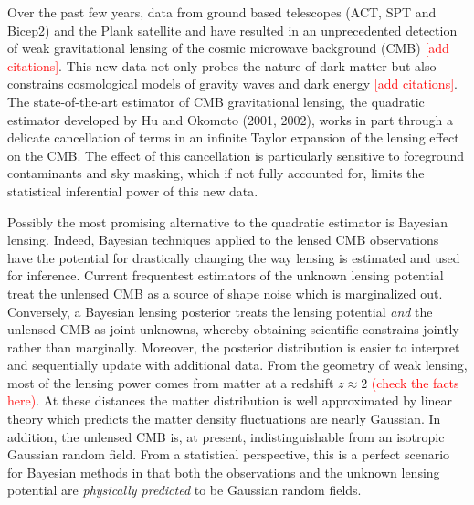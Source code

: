 \documentclass[noinfoline]{imsart}
\begin{document}
 Over the past few years, data from ground based telescopes (ACT, SPT and Bicep2) and the Plank satellite and have resulted in an unprecedented detection of weak gravitational lensing of the cosmic microwave background (CMB) \textcolor{red}{[add citations]}.  This new data not only probes the nature of dark matter but also constrains cosmological models of gravity waves and dark energy \textcolor{red}{[add citations]}. The state-of-the-art estimator of CMB gravitational lensing, the quadratic estimator developed by Hu and Okomoto (2001, 2002), works in part through a delicate cancellation of terms in an infinite Taylor expansion of the lensing effect on the CMB. The effect of this cancellation is particularly sensitive to foreground contaminants and sky masking, which  if not fully accounted for,  limits  the statistical inferential power of this new data.  

 Possibly the most promising alternative to the quadratic estimator is Bayesian lensing. Indeed, Bayesian techniques applied to the lensed CMB observations have the potential for drastically changing the way lensing is estimated and used for inference.  Current frequentest estimators of the unknown lensing potential treat the unlensed CMB as a source of shape noise which is marginalized out. Conversely, a Bayesian lensing posterior treats the lensing potential {\em and} the unlensed CMB as joint unknowns, whereby obtaining scientific constrains jointly rather than marginally. Moreover, the  posterior distribution is easier to interpret and sequentially update with additional data. From the geometry of weak lensing, most of the lensing power comes from matter at a redshift $z\approx 2$ \textcolor{red}{(check the facts here)}. At these distances the matter distribution is well approximated by linear theory which predicts the matter density fluctuations are nearly Gaussian. In addition, the unlensed CMB is, at present, indistinguishable from an isotropic Gaussian random field.  From a statistical perspective, this is a perfect scenario for Bayesian methods in that both the observations and the unknown lensing potential are {\em physically predicted} to be Gaussian random fields.  
 
\end{document}
